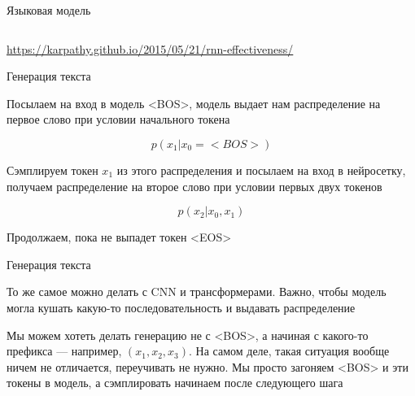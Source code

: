 \documentclass[notes,12pt, aspectratio=169]{beamer}
\newenvironment{wideitemize}{\itemize\addtolength{\itemsep}{10pt}}{\enditemize}
\begin{document}
\begin{frame}{Языковая модель}
\begin{columns}
\begin{column}{.7\linewidth}
\begin{center}
			\end{center}
		\end{column}	
	\end{columns}
	\vfill 
	\footnotesize 
	\color{blue} \url{https://karpathy.github.io/2015/05/21/rnn-effectiveness/} 
\end{frame}


\begin{frame}{Генерация текста}
	\begin{wideitemize}
		\item  Посылаем на вход в модель <BOS>, модель выдает нам распределение на первое слово при условии начального токена
		
				
		\[
		p(x_1 | x_0 = <BOS>)
		\]
		
		\item Сэмплируем токен $x_1$ из этого распределения и посылаем на вход в нейросетку, получаем распределение на второе слово при условии первых двух токенов

		\[
		p(x_2 | x_0, x_1)
		\]		
					
		\item  Продолжаем, пока не выпадет токен <EOS>
	\end{wideitemize}
\end{frame}


\begin{frame}{Генерация текста}
	\begin{wideitemize}
		\item  То же самое можно делать с CNN и трансформерами. Важно, чтобы модель могла кушать какую-то последовательность и выдавать распределение
		
		
		\item Мы можем хотеть делать генерацию не с <BOS>, а начиная с какого-то префикса — например, $(x_1, x_2, x_3)$. На самом деле, такая ситуация вообще ничем не отличается, переучивать не нужно. Мы просто загоняем <BOS> и эти токены в модель, а сэмплировать начинаем после следующего шага
	\end{wideitemize}
\end{frame}
\end{document}
